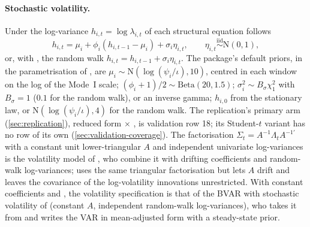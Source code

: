 \paragraph{Stochastic volatility.} Under  the log-variance $h_{i,t} = \log\lambda_{i,t}$
of each structural equation follows
\begin{equation}\label{eq:sv}
  h_{i,t} = \mu_i + \phi_i(h_{i,t-1} - \mu_i) + \sigma_i\eta_{i,t}, \qquad
  \eta_{i,t} \overset{\mathrm{iid}}{\sim} \mathrm{N}(0, 1),
\end{equation}
or, with , the random walk $h_{i,t} = h_{i,t-1} + \sigma_i\eta_{i,t}$. The package's
default priors, in the parametrisation of 
\citep{kastner2016dealing,hosszejni2021modeling}, are $\mu_i \sim \mathrm{N}(\log(\psi_i/\iota), 10)$,
centred in each window on the log of the Mode~I scale; $(\phi_i + 1)/2 \sim \mathrm{Beta}(20, 1.5)$; $\sigma_i^2 \sim
B_\sigma\chi^2_1$ with $B_\sigma = 1$ ($0.1$ for the random walk), or an inverse gamma; $h_{i,0}$ from
the stationary law, or $\mathrm{N}(\log(\psi_i/\iota), 4)$ for the random walk. %
The replication's primary arm (\cref{sec:replication}), reduced form $\times$ , is
validation row 18; its Student-$t$ variant has no row of its own
(\cref{sec:validation-coverage}). %
The factorisation $\Sigma_t = A^{-1}\Lambda_t A^{-1\prime}$ with a constant unit lower-triangular
$A$ and independent univariate log-variances is the volatility model of \citet{cogley2005drifts},
who combine it with drifting coefficients and random-walk log-variances; \citet{primiceri2005time}
uses the same triangular factorisation but lets $A$ drift and leaves the covariance of the
log-volatility innovations unrestricted. With constant coefficients and , the
volatility specification is that of the BVAR with stochastic volatility of
\citet{clark2011realtime} (constant $A$, independent random-walk log-variances), who takes it from
\citet{cogley2005drifts} and writes the VAR in mean-adjusted form with a steady-state prior.

